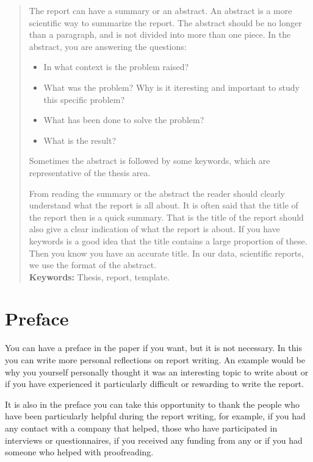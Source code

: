 \documentclass[a4paper, 12pt, titlepage, abstract, numbers=enddot]{scrreprt}
\begin{document}


 
\begin{abstract}
The report can have a summary or an abstract. An abstract is a more scientific way to
summarize the report. The abstract should be no longer than a paragraph, and is not
divided into more than one piece. In the abstract, you are answering the questions:

\begin{itemize}
	\item In what context is the problem raised?
	\item What was the problem? Why is it iteresting and important to study this specific problem?
	\item What has been done to solve the problem?
	\item What is the result?
\end{itemize}

Sometimes the abstract is followed by some keywords, which are representative of the thesis area.

From reading the summary or the abstract the reader should clearly understand what the report is all about. It is often said that the title of the report then is a quick summary. That is the title of the report should also give a clear indication of what the report is about. If you have keywords is a good idea that the title contains a large proportion of these. Then you know you have an accurate title. In our data, scientific reports, we use the format of the abstract.\\

\textbf{Keywords:}
Thesis, report, template.

\end{abstract}
\chapter*{Preface}
You can have a preface in the paper if you want, but it is not necessary. In this you can write more personal reflections on report writing. An example would be why you yourself personally thought it was an interesting topic to write about or if you have experienced it particularly difficult or rewarding to write the report.

It is also in the preface you can take this opportunity to thank the people who have been particularly helpful during the report writing, for example, if you had any contact with a company that helped, those who have participated in interviews or questionnaires, if you received any funding from any or if you had someone who helped with proofreading.
\end{document}
